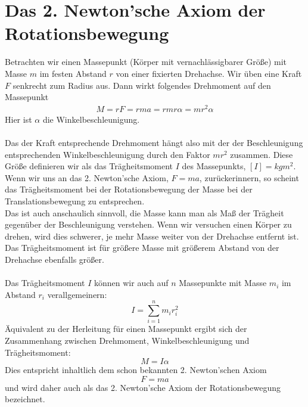\documentclass[11pt]{article}
\begin{document}
\section{Das 2. Newton'sche Axiom der Rotationsbewegung}
Betrachten wir einen Massepunkt (Körper mit vernachlässigbarer Größe) mit Masse $m$ im festen Abstand $r$ von einer fixierten Drehachse. Wir üben eine Kraft $F$ senkrecht zum Radius aus. Dann wirkt folgendes Drehmoment auf den Massepunkt
\begin{align*}
        M = rF = rma = rmr\alpha = mr^2\alpha
\end{align*}
Hier ist $\alpha$ die Winkelbeschleunigung. \\\\
Das der Kraft entsprechende Drehmoment hängt also mit der der Beschleunigung entsprechenden Winkelbeschleunigung durch den Faktor $mr^2$ zusammen. Diese Größe definieren wir als das Trägheitsmoment $I$ des Massepunkts, $[I] = kgm^2$. Wenn wir uns an das 2. Newton'sche Axiom, $F = ma$, zurückerinnern, so scheint das Trägheitsmoment bei der Rotationsbewegung der Masse bei der Translationsbewegung zu entsprechen. \\
Das ist auch anschaulich sinnvoll, die Masse kann man als Maß der Trägheit gegenüber der Beschleunigung verstehen. Wenn wir versuchen einen Körper zu drehen, wird dies schwerer, je mehr Masse weiter von der Drehachse entfernt ist. Das Trägheitsmoment ist für größere Masse mit größerem Abstand von der Drehachse ebenfalls größer. \\\\
Das Trägheitsmoment $I$ können wir auch auf $n$ Massepunkte mit Masse $m_i$ im Abstand $r_i$ verallgemeinern:
\begin{equation*}
        I = \sum_{i=1}^n m_ir_i^2
\end{equation*}
Äquivalent zu der Herleitung für einen Massepunkt ergibt sich der Zusammenhang zwischen Drehmoment, Winkelbeschleunigung und Trägheitsmoment: 
\begin{equation*}
        M = I\alpha
\end{equation*}
Dies entspricht inhaltlich dem schon bekannten 2. Newton'schen Axiom 
\begin{equation*}
        F = ma
\end{equation*}
und wird daher auch als das 2. Newton'sche Axiom der Rotationsbewegung bezeichnet. 
\end{document}
